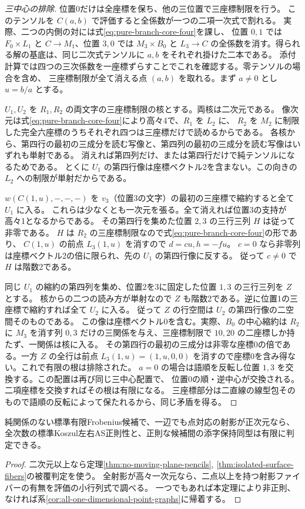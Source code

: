 \begin{proof}[三中心の排除]
位置0だけは全座標を保ち、他の三位置で三座標制限を行う。
このテンソルを $C(a,b)$ で評価すると全係数が一つの二項一次式で割れる。
実際、二つの内側の対には式\eqref{eq:pure-branch-core-four}を課し、
位置 $0,1$ では $F_0\times L_1$ と $C\to M_1$、位置 $3,0$ では $M_3\times B_0$ と
$L_3\to C$ の全係数を消す。得られる解の基底は、同じ二次式テンソルに $a,b$ をそれぞれ掛けた二本である。
添付計算では四つの三次係数を一座標ずらすことでこれを確認する。零テンソルの場合を含め、
三座標制限が全て消える点 $(a,b)$ を取れる。まず $a\ne0$ とし $u=b/a$ とする。

$U_1,U_2$ を $R_1,R_2$ の両文字の三座標制限の核とする。両核は二次元である。
像次元は式\eqref{eq:pure-branch-core-four}により高々4で、$R_1$ を $L_2$ に、
$R_2$ を $M_2$ に制限した完全六座標のうちそれぞれ四つは三座標だけで読めるからである。
各核から、第四行の最初の三成分を読む写像と、第四列の最初の三成分を読む写像はいずれも単射である。
消えれば第四列だけ、または第四行だけで純テンソルになるためである。
とくに $U_1$ の第四行像は座標ベクトル2を含まない。この向きの $L_2$ への制限が単射だからである。

$w(C(1,u),-,-,-)$ を $v_3$（位置3の文字）の最初の三座標で縮約すると全て $U_1$ に入る。
これらは少なくとも一次元を張る。全て消えれば位置3の支持が高々1となるからである。
その第四行を集めた位置 $2,3$ の三行三列 $H$ は従って非零である。
$H$ は $R_2$ の三座標制限なので式\eqref{eq:pure-branch-core-four}の形であり、
$C(1,u)$ の前点 $L_3(1,u)$ を消すので $d=cu, h=-fu$。
$c=0$ なら非零列は座標ベクトル2の倍に限られ、先の $U_1$ の第四行像に反する。
従って $c\ne0$ で $H$ は階数2である。

同じ $U_1$ の縮約の第四列を集め、位置2を3に固定した位置 $1,3$ の三行三列を $Z$ とする。
核からの二つの読み方が単射なので $Z$ も階数2である。逆に位置1の三座標で縮約すれば全て $U_2$ に入る。
従って $Z$ の行空間は $U_2$ の第四行像の二空間そのものである。
この像は座標ベクトル0を含む。実際、$B_0$ の中心縮約は $R_2$ に $M_3$ を消す列 $0,3$
だけの三関係を与え、三座標制限で $10,20$ の二座標しか持たず、一関係は核に入る。
その第四行の最初の三成分は非零な座標0の倍である。一方 $Z$ の全行は前点
$L_3(1,u)=(1,u,0,0)$ を消すので座標0を含み得ない。これで有限の根は排除された。
$a=0$ の場合は語順を反転し位置 $1,3$ を交換する。この配置は再び同じ三中心配置で、
位置0の順・逆中心が交換される。二項座標を交換すればその根は有限になる。
三座標部分は二直線の線型包そのもので語順の反転によって保たれるから、同じ矛盾を得る。
\end{proof}

\begin{corollary}\label{cor:positive-dimensional-pure-free-decision}
純関係のない標準有限Frobenius候補で、一辺でも点対応の射影が正次元なら、
全次数の標準Koszul左右AS正則性と、正則な候補間の添字保持同型は有限に判定できる。
\end{corollary}
\begin{proof}
二次元以上なら定理\ref{thm:no-moving-plane-pencils}, \ref{thm:isolated-surface-fibers}の被覆判定を使う。
全射影が高々一次元なら、二点以上を持つ射影ファイバーの有無を評価の小行列式で調べる。
一つでもあれば本定理により非正則、なければ系\ref{cor:all-one-dimensional-point-graphs}に帰着する。
\end{proof}
